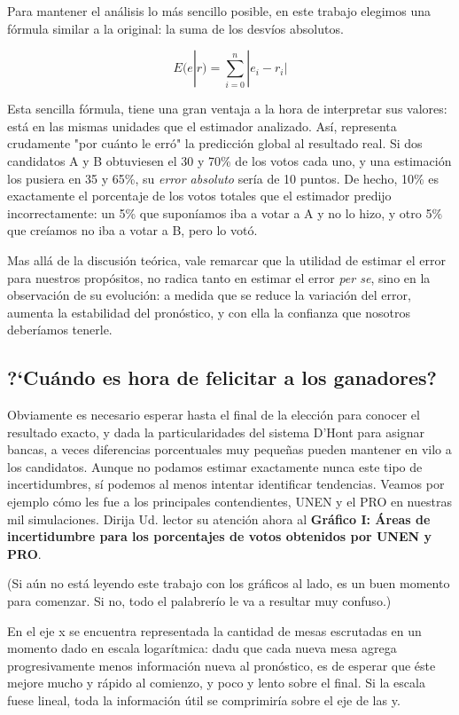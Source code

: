 \documentclass[12pt, a4paper]{article}
\begin{document}
Para mantener el an\'alisis lo m\'as sencillo posible, en este trabajo elegimos una f\'ormula similar a la original: la suma de los desv\'ios absolutos.

$$ E(e|r) = \sum\limits_{i=0}^{n} | e_{i} - r_{i} | $$

Esta sencilla f\'ormula, tiene una gran ventaja a la hora de interpretar sus valores: est\'a en las mismas unidades que el estimador analizado. As\'i, representa crudamente "por cu\'anto le err\'o" la predicci\'on global al resultado real. Si dos candidatos A y B obtuviesen el 30 y 70\% de los votos cada uno, y una estimaci\'on los pusiera en 35 y 65\%, su \emph{error absoluto} ser\'ia de 10 puntos. De hecho, 10\% es exactamente el porcentaje de los votos totales que el estimador predijo incorrectamente: un 5\% que supon\'iamos iba a votar a A y no lo hizo, y otro 5\% que cre\'iamos no iba a votar a B, pero lo vot\'o.

Mas all\'a de la discusi\'on te\'orica, vale remarcar que la utilidad de estimar el error para nuestros prop\'ositos, no radica tanto en estimar el error \emph{per se}, sino en la observaci\'on de su evoluci\'on: a medida que se reduce la variaci\'on del error, aumenta la estabilidad del pron\'ostico, y con ella la confianza que nosotros deber\'iamos tenerle.

\subsection{?`Cu\'ando es hora de felicitar a los ganadores?}

Obviamente es necesario esperar hasta el final de la elecci\'on para conocer el resultado exacto, y dada la particularidades del sistema D'Hont para asignar bancas, a veces diferencias porcentuales muy peque\~nas pueden mantener en vilo a los candidatos. Aunque no podamos estimar exactamente nunca este tipo de incertidumbres, s\'i podemos al menos intentar identificar tendencias. Veamos por ejemplo c\'omo les fue a los principales contendientes, UNEN y el PRO en nuestras mil simulaciones. Dirija Ud. lector su atenci\'on ahora al \textbf{Gr\'afico I: \'Areas de incertidumbre para los porcentajes de votos obtenidos por UNEN y PRO}. 

(Si a\'un no est\'a leyendo este trabajo con los gr\'aficos al lado, es un buen momento para comenzar. Si no, todo el palabrer\'io le va a resultar muy confuso.)

En el eje x se encuentra representada la cantidad de mesas escrutadas en un momento dado en escala logar\'itmica: dadu que cada nueva mesa agrega progresivamente menos informaci\'on nueva al pron\'ostico, es de esperar que \'este mejore mucho y r\'apido al comienzo, y poco y lento sobre el final. Si la escala fuese lineal, toda la informaci\'on \'util se comprimir\'ia sobre el eje de las y.
\end{document}

